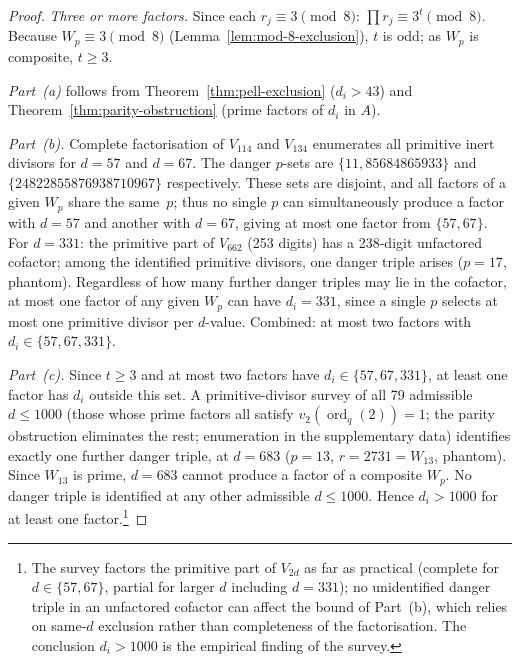 \documentclass[12pt]{article}
\theoremstyle{plain}
\theoremstyle{definition}
\theoremstyle{remark}
\begin{document}
\begin{proof}
\emph{Three or more factors.}\; Since each
\(r_j \equiv 3 \pmod{8}\):
\(\prod r_j \equiv 3^t \pmod{8}\). Because
\(W_p \equiv 3 \pmod{8}\) (Lemma~\ref{lem:mod-8-exclusion}), \(t\) is odd;
as \(W_p\) is composite, \(t \geq 3\).

\emph{Part~(a)} follows from Theorem~\ref{thm:pell-exclusion}
(\(d_i > 43\)) and Theorem~\ref{thm:parity-obstruction} (prime
factors of \(d_i\) in \(A\)).

\emph{Part~(b).}\; Complete factorisation of \(V_{114}\) and
\(V_{134}\) enumerates all primitive inert divisors for \(d = 57\)
and \(d = 67\). The danger \(p\)\nobreakdash-sets are
\(\{11, 85684865933\}\) and \(\{24822855876938710967\}\)
respectively. These sets are disjoint, and all factors of a
given \(W_p\) share the same~\(p\); thus no single \(p\) can
simultaneously produce a factor with \(d = 57\) and another with
\(d = 67\), giving at most one factor from
\(\{57, 67\}\). For \(d = 331\): the primitive part of \(V_{662}\)
(253 digits) has a 238-digit unfactored cofactor; among the
identified primitive divisors, one danger triple arises
(\(p = 17\), phantom). Regardless of how many further danger
triples may lie in the cofactor, at most one factor of any
given \(W_p\) can have \(d_i = 331\), since a single \(p\) selects
at most one primitive divisor per \(d\)-value. Combined: at most
two factors with \(d_i \in \{57, 67, 331\}\).

\emph{Part~(c).}\; Since \(t \geq 3\) and at most two factors
have \(d_i \in \{57, 67, 331\}\), at least one factor has \(d_i\)
outside this set. A primitive-divisor survey of all 79
admissible \(d \leq 1000\) (those whose prime factors all
satisfy \(v_2(\operatorname{ord}_q(2)) = 1\); the parity
obstruction eliminates the rest; enumeration in the
supplementary data) identifies exactly one further danger
triple, at \(d = 683\) (\(p = 13\), \(r = 2731 = W_{13}\),
phantom). Since \(W_{13}\) is prime, \(d = 683\) cannot produce a
factor of a composite \(W_p\). No danger triple is identified at
any other admissible \(d \leq 1000\). Hence \(d_i > 1000\) for
at least one factor.\footnote{The survey factors the primitive
part of \(V_{2d}\) as far as practical (complete for
\(d \in \{57, 67\}\), partial for larger \(d\) including \(d = 331\));
no unidentified danger triple in an unfactored cofactor can
affect the bound of Part~(b), which relies on same-\(d\) exclusion
rather than completeness of the factorisation. The conclusion
\(d_i > 1000\) is the empirical finding of the survey.}
\end{proof}
\end{document}
